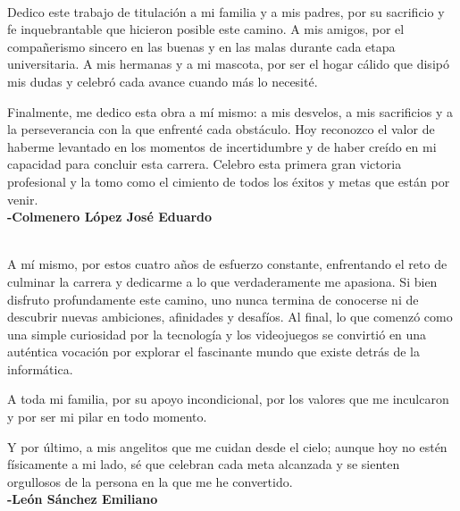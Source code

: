 \begin{dedicatoria}\\
Dedico este trabajo de titulación a mi familia y a mis padres, por su sacrificio y fe inquebrantable que hicieron posible este camino. A mis amigos, por el compañerismo sincero en las buenas y en las malas durante cada etapa universitaria. A mis hermanas y a mi mascota, por ser el hogar cálido que disipó mis dudas y celebró cada avance cuando más lo necesité.

Finalmente, me dedico esta obra a mí mismo: a mis desvelos, a mis sacrificios y a la perseverancia con la que enfrenté cada obstáculo. Hoy reconozco el valor de haberme levantado en los momentos de incertidumbre y de haber creído en mi capacidad para concluir esta carrera. Celebro esta primera gran victoria profesional y la tomo como el cimiento de todos los éxitos y metas que están por venir.\\

\textbf{-Colmenero López José Eduardo}
\end{dedicatoria}

\begin{dedicatoria}\\
A mí mismo, por estos cuatro años de esfuerzo constante, enfrentando el reto de culminar la carrera y dedicarme a lo que verdaderamente me apasiona. Si bien disfruto profundamente este camino, uno nunca termina de conocerse ni de descubrir nuevas ambiciones, afinidades y desafíos. Al final, lo que comenzó como una simple curiosidad por la tecnología y los videojuegos se convirtió en una auténtica vocación por explorar el fascinante mundo que existe detrás de la informática.

A toda mi familia, por su apoyo incondicional, por los valores que me inculcaron y por ser mi pilar en todo momento.

Y por último, a mis angelitos que me cuidan desde el cielo; aunque hoy no estén físicamente a mi lado, sé que celebran cada meta alcanzada y se sienten orgullosos de la persona en la que me he convertido.\\

\textbf{-León Sánchez Emiliano}
\end{dedicatoria}
